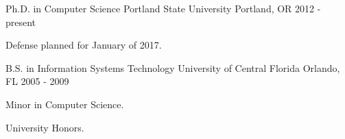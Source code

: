 

\begin{cventries}

  \cventry
    {Ph.D. in Computer Science} %
    {Portland State University} %
    {Portland, OR} %
    {2012 - present} %
    {
      \begin{cvitems} %
        \item {Defense planned for January of 2017.}
      \end{cvitems}
    }



  \cventry
    {B.S. in Information Systems Technology} %
    {University of Central Florida} %
    {Orlando, FL} %
    {2005 - 2009} %
    {
      \begin{cvitems} %
        \item {Minor in Computer Science.}
        \item {University Honors.}
      \end{cvitems}
    }

\end{cventries}
